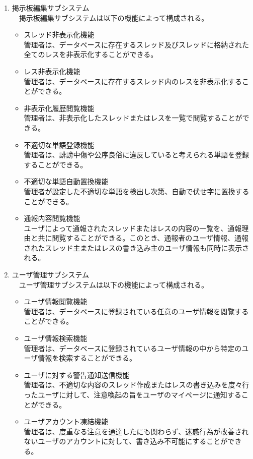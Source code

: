 \documentclass[a4j]{jarticle}
\begin{document}
\begin{enumerate}
  \item 掲示板編集サブシステム\\
  　掲示板編集サブシステムは以下の機能によって構成される。
  \begin{itemize}
    \item スレッド非表示化機能\\
    管理者は、データベースに存在するスレッド及びスレッドに格納された全てのレスを非表示化することができる。
    \item レス非表示化機能\\
    管理者は、データベースに存在するスレッド内のレスを非表示化することができる。
    \item 非表示化履歴閲覧機能\\
    管理者は、非表示化したスレッドまたはレスを一覧で閲覧することができる。
    \item 不適切な単語登録機能\\
    管理者は、誹謗中傷や公序良俗に違反していると考えられる単語を登録することができる。
    \item 不適切な単語自動置換機能\\
    管理者が設定した不適切な単語を検出し次第、自動で伏せ字に置換することができる。
    \item 通報内容閲覧機能\\
    ユーザによって通報されたスレッドまたはレスの内容の一覧を、通報理由と共に閲覧することができる。このとき、通報者のユーザ情報、通報されたスレッド主またはレスの書き込み主のユーザ情報も同時に表示される。\\
  \end{itemize}


  \item ユーザ管理サブシステム\\
  　ユーザ管理サブシステムは以下の機能によって構成される。
  \begin{itemize}
    \item ユーザ情報閲覧機能\\
    管理者は、データベースに登録されている任意のユーザ情報を閲覧することができる。
    \item ユーザ情報検索機能\\
    管理者は、データベースに登録されているユーザ情報の中から特定のユーザ情報を検索することができる。
    \item ユーザに対する警告通知送信機能\\
    管理者は、不適切な内容のスレッド作成またはレスの書き込みを度々行ったユーザに対して、注意喚起の旨をユーザのマイページに通知することができる。
    \item ユーザアカウント凍結機能\\
    管理者は、度重なる注意を通達したにも関わらず、迷惑行為が改善されないユーザのアカウントに対して、書き込み不可能にすることができる。\\
  \end{itemize}



\end{enumerate}
\end{document}

